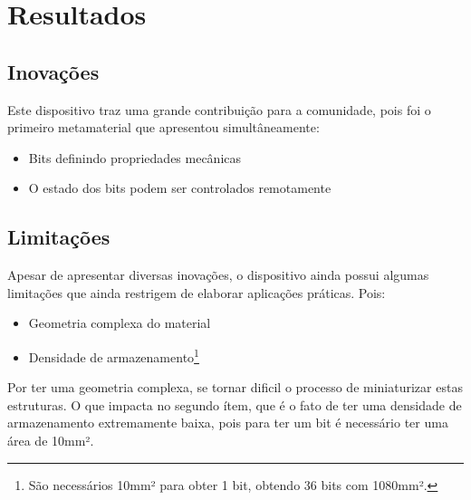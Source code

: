 \section{Resultados}

\subsection{Inovações}
Este dispositivo traz uma grande contribuição para a comunidade, pois foi o primeiro metamaterial que apresentou simultâneamente:

\begin{itemize}
    \item Bits definindo propriedades mecânicas
    \item O estado dos bits podem ser controlados remotamente
\end{itemize}

\subsection{Limitações}
Apesar de apresentar diversas inovações, o dispositivo ainda possui algumas limitações que ainda restrigem de elaborar aplicações práticas. Pois:
\begin{itemize}
    \item Geometria complexa do material
    \item Densidade de armazenamento\footnote[1]{São necessários 10mm² para obter 1 bit, obtendo 36 bits com 1080mm².}
\end{itemize}

Por ter uma geometria complexa, se tornar dificil o processo de miniaturizar estas estruturas. O que impacta no segundo ítem, que é o fato de ter uma densidade de armazenamento extremamente baixa, pois para ter um bit é necessário ter uma área de 10mm².

